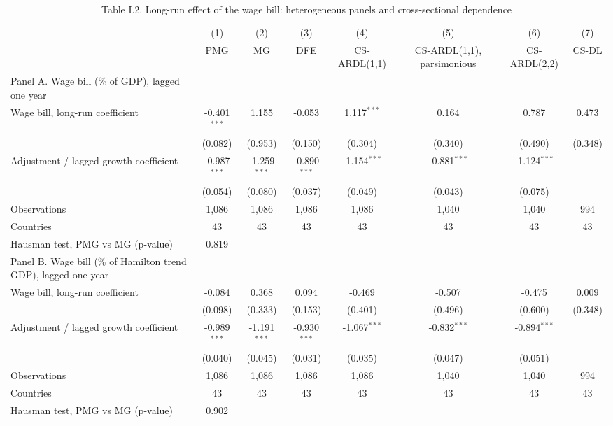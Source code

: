 \begin{table}[htbp]\centering\footnotesize
\providecommand{\sym}[1]{\ensuremath{^{#1}}}
\caption{Table L2. Long-run effect of the wage bill: heterogeneous panels and cross-sectional dependence}\label{tab:TableL2_long_run}
\begin{tabular}{l*{7}{c}}
\toprule
 & (1) & (2) & (3) & (4) & (5) & (6) & (7) \\
 & PMG & MG & DFE & CS-ARDL(1,1) & CS-ARDL(1,1), parsimonious & CS-ARDL(2,2) & CS-DL \\
\midrule
Panel A. Wage bill (\% of GDP), lagged one year &  &  &  &  &  &  &  \\
Wage bill, long-run coefficient & -0.401\sym{***} & 1.155 & -0.053 & 1.117\sym{***} & 0.164 & 0.787 & 0.473 \\
 & (0.082) & (0.953) & (0.150) & (0.304) & (0.340) & (0.490) & (0.348) \\
Adjustment / lagged growth coefficient & -0.987\sym{***} & -1.259\sym{***} & -0.890\sym{***} & -1.154\sym{***} & -0.881\sym{***} & -1.124\sym{***} &  \\
 & (0.054) & (0.080) & (0.037) & (0.049) & (0.043) & (0.075) &  \\
Observations & 1,086 & 1,086 & 1,086 & 1,086 & 1,040 & 1,040 & 994 \\
Countries & 43 & 43 & 43 & 43 & 43 & 43 & 43 \\
Hausman test, PMG vs MG (p-value) & 0.819 &  &  &  &  &  &  \\
\midrule
Panel B. Wage bill (\% of Hamilton trend GDP), lagged one year &  &  &  &  &  &  &  \\
Wage bill, long-run coefficient & -0.084 & 0.368 & 0.094 & -0.469 & -0.507 & -0.475 & 0.009 \\
 & (0.098) & (0.333) & (0.153) & (0.401) & (0.496) & (0.600) & (0.348) \\
Adjustment / lagged growth coefficient & -0.989\sym{***} & -1.191\sym{***} & -0.930\sym{***} & -1.067\sym{***} & -0.832\sym{***} & -0.894\sym{***} &  \\
 & (0.040) & (0.045) & (0.031) & (0.035) & (0.047) & (0.051) &  \\
Observations & 1,086 & 1,086 & 1,086 & 1,086 & 1,040 & 1,040 & 994 \\
Countries & 43 & 43 & 43 & 43 & 43 & 43 & 43 \\
Hausman test, PMG vs MG (p-value) & 0.902 &  &  &  &  &  &  \\
\bottomrule
\end{tabular}

\end{table}
